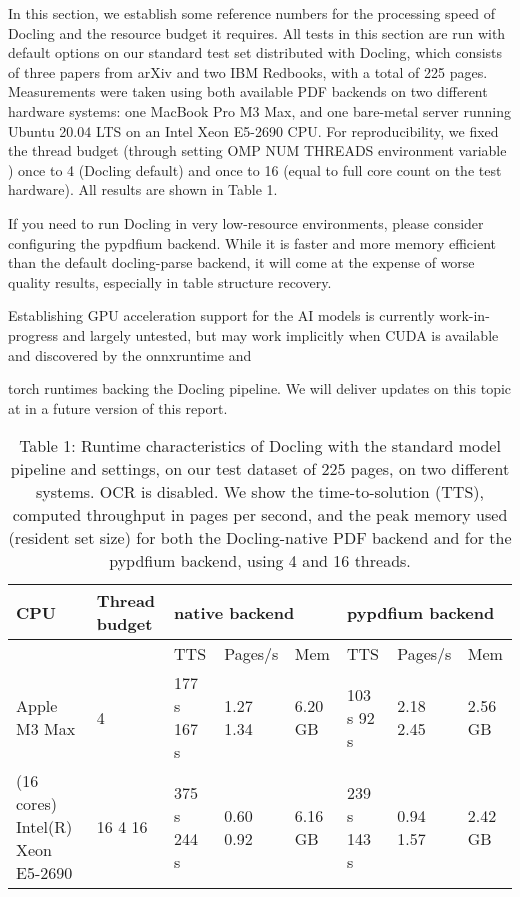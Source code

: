 \documentclass[11pt,a4paper]{article}
\begin{document}
In this section, we establish some reference numbers for the processing speed of Docling and the resource budget it requires. All tests in this section are run with default options on our standard test set distributed with Docling, which consists of three papers from arXiv and two IBM Redbooks, with a total of 225 pages. Measurements were taken using both available PDF backends on two different hardware systems: one MacBook Pro M3 Max, and one bare-metal server running Ubuntu 20.04 LTS on an Intel Xeon E5-2690 CPU. For reproducibility, we fixed the thread budget (through setting OMP NUM THREADS environment variable ) once to 4 (Docling default) and once to 16 (equal to full core count on the test hardware). All results are shown in Table 1.

If you need to run Docling in very low-resource environments, please consider configuring the pypdfium backend. While it is faster and more memory efficient than the default docling-parse backend, it will come at the expense of worse quality results, especially in table structure recovery.

Establishing GPU acceleration support for the AI models is currently work-in-progress and largely untested, but may work implicitly when CUDA is available and discovered by the onnxruntime and

torch runtimes backing the Docling pipeline. We will deliver updates on this topic at in a future version of this report.

\begin{table}[h]
\caption{Table 1: Runtime characteristics of Docling with the standard model pipeline and settings, on our test dataset of 225 pages, on two different systems. OCR is disabled. We show the time-to-solution (TTS), computed throughput in pages per second, and the peak memory used (resident set size) for both the Docling-native PDF backend and for the pypdfium backend, using 4 and 16 threads.}
\begin{tabular}{llllllll}
\toprule
CPU & Thread budget & \multicolumn{3}{l}{native backend} & \multicolumn{3}{l}{pypdfium backend} \\
\midrule
 &  & TTS & Pages/s & Mem & TTS & Pages/s & Mem \\
Apple M3 Max & 4 & 177 s 167 s & 1.27 1.34 & 6.20 GB & 103 s 92 s & 2.18 2.45 & 2.56 GB \\
(16 cores) Intel(R) Xeon E5-2690 & 16 4 16 & 375 s 244 s & 0.60 0.92 & 6.16 GB & 239 s 143 s & 0.94 1.57 & 2.42 GB \\
\bottomrule
\end{tabular}
\end{table}
\end{document}
